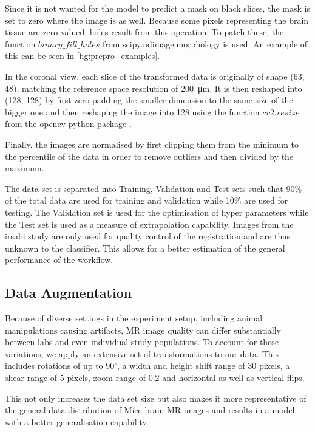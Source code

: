 Since it is not wanted for the model to predict a mask on black slices, the mask is set to zero where the image is as well.
Because some pixels representing the brain tissue are zero-valued, holes result from this operation.
To patch these, the function \textcolor{mg}{\texttt{$binary\_fill\_holes$}} from scipy.ndimage.morphology \cite{noauthor_multi-dimensional_nodate} is used.
An example of this can be seen in \cref{fig:prepro_examples}.

In the coronal view, each slice of the transformed data is originally of shape (63, 48), matching the reference space resolution of \SI{200}{\micro\metre}.
It is then reshaped into (128, 128) by first zero-padding the smaller dimension to the same size of the bigger one and then reshaping the image into 128 using the function \textcolor{mg}{\texttt{$cv2.resize$}} from the opencv python package \cite{noauthor_opencv-python_nodate}.

Finally, the images are normalised by first clipping them from the minimum to the  percentile of the data in order to remove outliers and then divided by the maximum.

The data set is separated into Training, Validation and Test sets such that 90\% of the total data are used for training and validation while 10\% are used for testing.
The Validation set is used for the optimisation of hyper parameters while the Test set is used as a measure of extrapolation capability.
Images from the irsabi study are only used for quality control of the registration and are thus unknown to the classifier.
This allows for a better estimation of the general performance of the workflow.

\subsection{Data Augmentation} \label{Data Augmentation}

Because of diverse settings in the experiment setup, including animal manipulations causing artifacts, MR image quality can differ substantially between labs and even individual study populations.
To account for these variations, we apply an extensive set of transformations to our data.
This includes rotations of up to 90$^{\circ}$, a width and height shift range of 30 pixels, a shear range of 5 pixels, zoom range of 0.2 and horizontal as well as vertical flips.

This not only increases the data set size but also makes it more representative of the general data distribution of Mice brain MR images and results in a model with a better generalisation capability.

